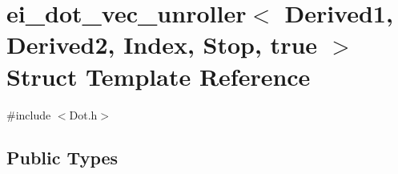 \hypertarget{structei__dot__vec__unroller_3_01_derived1_00_01_derived2_00_01_index_00_01_stop_00_01true_01_4}{\section{ei\-\_\-dot\-\_\-vec\-\_\-unroller$<$ Derived1, Derived2, Index, Stop, true $>$ Struct Template Reference}
\label{structei__dot__vec__unroller_3_01_derived1_00_01_derived2_00_01_index_00_01_stop_00_01true_01_4}
}


{\ttfamily \#include $<$Dot.\-h$>$}

\subsection*{Public Types}
